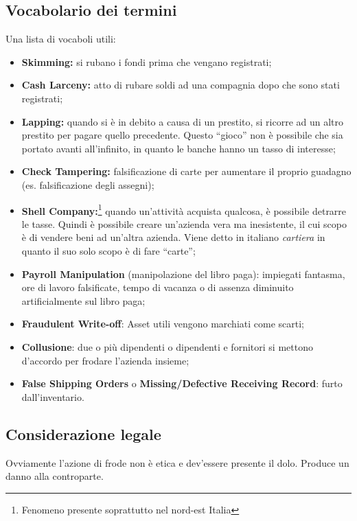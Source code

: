 \subsection{Vocabolario dei termini}

Una lista di vocaboli utili:
\begin{itemize}
  \item \textbf{Skimming:} si rubano i fondi prima che vengano registrati;
  \item \textbf{Cash Larceny:} atto di rubare soldi ad una compagnia 
  dopo che sono stati registrati;
  \item \textbf{Lapping:} quando si è in debito a causa di un prestito,
  si ricorre ad un altro prestito per pagare quello precedente. Questo 
  ``gioco'' non è possibile che sia portato avanti all'infinito, in 
  quanto le banche hanno un tasso di interesse;
  \item \textbf{Check Tampering:} falsificazione di carte per aumentare il proprio 
  guadagno (es. falsificazione degli assegni);
  \item \textbf{Shell Company:}\footnote{Fenomeno presente soprattutto nel nord-est 
  Italia} quando un'attività acquista qualcosa, è possibile detrarre le tasse. Quindi è
  possibile creare un'azienda vera ma inesistente, il cui scopo è di vendere
  beni ad un'altra azienda. Viene detto in italiano \textit{cartiera} in quanto il suo 
  solo scopo è di fare ``carte'';
  \item \textbf{Payroll Manipulation} (manipolazione del libro paga):
  impiegati fantasma, ore di lavoro falsificate, tempo di vacanza
  o di assenza diminuito artificialmente sul libro paga;
  \item \textbf{Fraudulent Write-off}: Asset utili vengono marchiati
  come scarti;
  \item \textbf{Collusione}: due o più dipendenti o dipendenti e 
  fornitori si mettono d'accordo per frodare l'azienda insieme;
  \item \textbf{False Shipping Orders} o \textbf{Missing/Defective 
  Receiving Record}: furto dall'inventario.
\end{itemize}

\subsection{Considerazione legale}

Ovviamente l'azione di frode non è etica e dev'essere presente il dolo. Produce 
un danno alla controparte.

